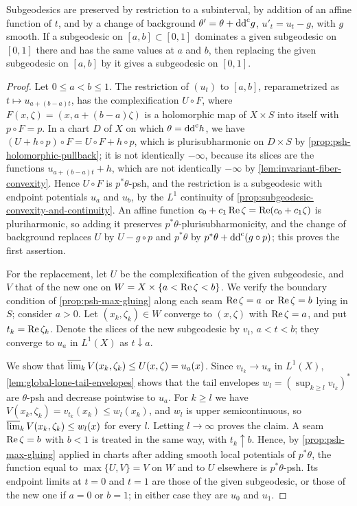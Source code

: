 \begin{lemma}\label{lem:subgeodesic-operations-and-pasting}
Subgeodesics are preserved by restriction to a subinterval, by addition of an affine function of $t$, and by a change of background $\theta'=\theta+\mathrm{dd}^{\mathrm{c}} g$, $u'_t=u_t-g$, with $g$ smooth. If a subgeodesic on $[a,b]\subset[0,1]$ dominates a given subgeodesic on $[0,1]$ there and has the same values at $a$ and $b$, then replacing the given subgeodesic on $[a,b]$ by it gives a subgeodesic on $[0,1]$.
\end{lemma}
\begin{proof}
Let $0\leq a<b\leq1$. The restriction of $(u_t)$ to $[a,b]$, reparametrized as $t\mapsto u_{a+(b-a)t}$, has the complexification $U\circ F$, where $F(x,\zeta)=(x,a+(b-a)\zeta)$ is a holomorphic map of $X\times S$ into itself with $p\circ F=p$. In a chart $D$ of $X$ on which $\theta=\mathrm{dd}^{\mathrm{c}} h$, we have $(U+h\circ p)\circ F=U\circ F+h\circ p$, which is plurisubharmonic on $D\times S$ by \cref{prop:psh-holomorphic-pullback}; it is not identically $-\infty$, because its slices are the functions $u_{a+(b-a)t}+h$, which are not identically $-\infty$ by \cref{lem:invariant-fiber-convexity}. Hence $U\circ F$ is $p^*\theta$-psh, and the restriction is a subgeodesic with endpoint potentials $u_a$ and $u_b$, by the $L^1$ continuity of \cref{prop:subgeodesic-convexity-and-continuity}. An affine function $c_0+c_1\operatorname{Re}\zeta=\operatorname{Re}(c_0+c_1\zeta)$ is pluriharmonic, so adding it preserves $p^*\theta$-plurisubharmonicity, and the change of background replaces $U$ by $U-g\circ p$ and $p^*\theta$ by $p^*\theta+\mathrm{dd}^{\mathrm{c}}(g\circ p)$; this proves the first assertion.

For the replacement, let $U$ be the complexification of the given subgeodesic, and $V$ that of the new one on $W=X\times\{a<\operatorname{Re}\zeta<b\}$. We verify the boundary condition of \cref{prop:psh-max-gluing} along each seam $\operatorname{Re}\zeta=a$ or $\operatorname{Re}\zeta=b$ lying in $S$; consider $a>0$. Let $(x_k,\zeta_k)\in W$ converge to $(x,\zeta)$ with $\operatorname{Re}\zeta=a$, and put $t_k=\operatorname{Re}\zeta_k$. Denote the slices of the new subgeodesic by $v_t$, $a<t<b$; they converge to $u_a$ in $L^1(X)$ as $t\downarrow a$.

We show that $\varlimsup_kV(x_k,\zeta_k)\leq U(x,\zeta)=u_a(x)$. Since $v_{t_k}\to u_a$ in $L^1(X)$, \cref{lem:global-lone-tail-envelopes} shows that the tail envelopes $w_l=(\sup_{k\geq l}v_{t_k})^*$ are $\theta$-psh and decrease pointwise to $u_a$. For $k\geq l$ we have $V(x_k,\zeta_k)=v_{t_k}(x_k)\leq w_l(x_k)$, and $w_l$ is upper semicontinuous, so $\varlimsup_kV(x_k,\zeta_k)\leq w_l(x)$ for every $l$. Letting $l\to\infty$ proves the claim. A seam $\operatorname{Re}\zeta=b$ with $b<1$ is treated in the same way, with $t_k\uparrow b$. Hence, by \cref{prop:psh-max-gluing} applied in charts after adding smooth local potentials of $p^*\theta$, the function equal to $\max\{U,V\}=V$ on $W$ and to $U$ elsewhere is $p^*\theta$-psh. Its endpoint limits at $t=0$ and $t=1$ are those of the given subgeodesic, or those of the new one if $a=0$ or $b=1$; in either case they are $u_0$ and $u_1$.
\end{proof}

